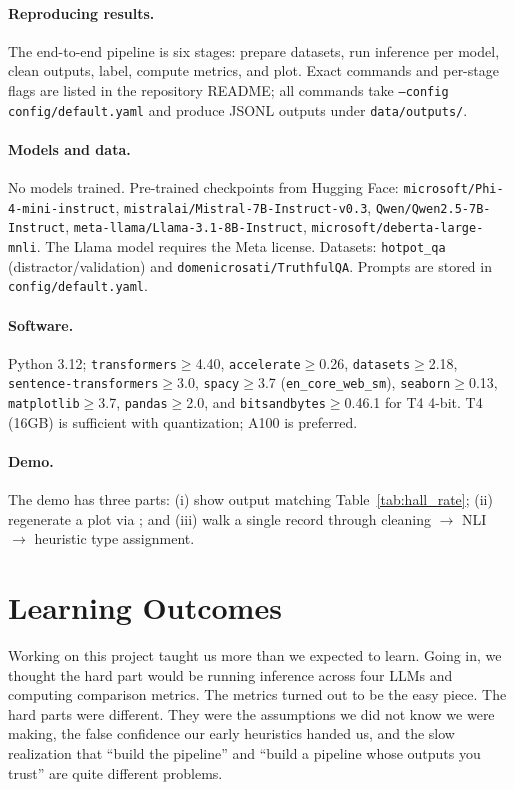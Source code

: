 \documentclass[11pt,a4paper]{article}
\begin{document}
\paragraph{Reproducing results.} The end-to-end pipeline is six stages: prepare datasets, run inference per model, clean outputs, label, compute metrics, and plot. Exact commands and per-stage flags are listed in the repository README; all commands take \texttt{--config config/default.yaml} and produce JSONL outputs under \texttt{data/outputs/}.

\paragraph{Models and data.} No models trained. Pre-trained checkpoints from Hugging Face: \texttt{microsoft/Phi-4-mini-instruct}, \texttt{mistralai/Mistral-7B-Instruct-v0.3}, \texttt{Qwen/Qwen2.5-7B-Instruct}, \texttt{meta-llama/Llama-3.1-8B-Instruct}, \texttt{microsoft/deberta-large-mnli}. The Llama model requires the Meta license. Datasets: \texttt{hotpot\_qa} (distractor/validation) and \texttt{domenicrosati/TruthfulQA}. Prompts are stored in \texttt{config/default.yaml}.

\paragraph{Software.} Python 3.12; \texttt{transformers}$\geq$4.40, \texttt{accelerate}$\geq$0.26, \texttt{datasets}$\geq$2.18, \texttt{sentence-transformers}$\geq$3.0, \texttt{spacy}$\geq$3.7 (\texttt{en\_core\_web\_sm}), \texttt{seaborn}$\geq$0.13, \texttt{matplotlib}$\geq$3.7, \texttt{pandas}$\geq$2.0, and \texttt{bitsandbytes}$\geq$0.46.1 for T4 4-bit. T4 (16GB) is sufficient with quantization; A100 is preferred.

\paragraph{Demo.} The demo has three parts: (i) show  output matching Table~\ref{tab:hall_rate}; (ii) regenerate a plot via ; and (iii) walk a single record through cleaning $\rightarrow$ NLI $\rightarrow$ heuristic type assignment.

\section{Learning Outcomes}

Working on this project taught us more than we expected to learn. Going in, we thought the hard part would be running inference across four LLMs and computing comparison metrics. The metrics turned out to be the easy piece. The hard parts were different. They were the assumptions we did not know we were making, the false confidence our early heuristics handed us, and the slow realization that ``build the pipeline'' and ``build a pipeline whose outputs you trust'' are quite different problems.
\end{document}
